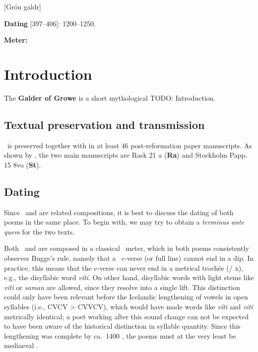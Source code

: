 [Gróu galdr]

\begin{flushright}%
\textbf{Dating} \parencite{Robinson1991}[397--406]: 1200--1250.

\textbf{Meter:} \Fornyrdislag%
\end{flushright}

\section{Introduction}

The \textbf{Galder of Growe} is a short mythological TODO: Introduction.

\subsection{Textual preservation and transmission}

\Grougaldr\ is preserved together with  in at least 46 post-reformation paper manuscripts.  As shown by \textcite{Robinson1991}, the two main manuscripts are Rask 21 a (\textbf{Ra}) and Stockholm Papp. 15 8vo (\textbf{St}).

\subsection{Dating}

Since \Grougaldr\ and  are related compositions, it is best to discuss the dating of both poems in the same place.  To begin with, we may try to obtain a \emph{terminus ante quem} for the two texts.

Both \Grougaldr\ and  are composed in a classical \Ljodahattr\ meter, which in both poems consistently observes Bugge’s rule, namely that a \Ljodahattr\ c-verse (or full line) cannot end in a dip.  In practice, this means that the c-verse can never end in a metrical trochée (/ x), e.g., the disyllabic word \emph{víti}.  On other hand, disyllabic words with light stems like \emph{viti} or \emph{saman} are allowed, since they resolve into a single lift.  This distinction could only have been relevant before the Icelandic lengthening of vowels in open syllables (i.e., CVCV > CVVCV), which would have made words like \emph{víti} and \emph{viti} metrically identical; a poet working after this sound change can not be expected to have been aware of the historical distinction in syllable quantity.  Since this lengthening was complete by ca.~1400 \ce, the poems must at the very least be mediaeval \parencite[401]{Robinson1991}.

